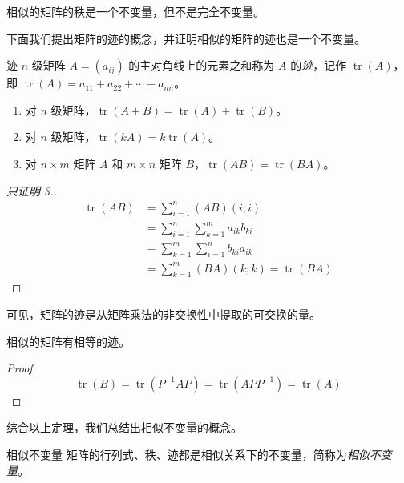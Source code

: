 \begin{theorem}
	相似的矩阵的秩是一个不变量，但不是完全不变量。
\end{theorem}

下面我们提出矩阵的迹的概念，并证明相似的矩阵的迹也是一个不变量。

\begin{definition}{迹}
	$n$ 级矩阵 $A = (a_{ij})$ 的主对角线上的元素之和称为 $A$ 的\emph{迹}，记作 $\operatorname{tr}(A)$， 即 $\operatorname{tr}(A) = a_{11} + a_{22} + \cdots + a_{nn}$。
\end{definition}

\begin{theorem}[矩阵的迹的运算性质]
	\begin{enumerate}
		\item 对 $n$ 级矩阵，$\operatorname{tr}(A + B) = \operatorname{tr}(A) + \operatorname{tr}(B)$。
		\item 对 $n$ 级矩阵，$\operatorname{tr}(kA) = k \operatorname{tr}(A)$。
		\item 对 $n \times m$ 矩阵 $A$ 和 $m \times n$ 矩阵 $B$，$\operatorname{tr}(AB) = \operatorname{tr}(BA)$。
	\end{enumerate}
\end{theorem}

\begin{proof}[只证明 3.]
	$$
	\begin{aligned}
		\operatorname{tr}(AB) &= \sum\limits_{i = 1}^n (AB)(i; i)
		\\&=
		\sum\limits_{i = 1}^n \sum\limits_{k = 1}^m a_{ik} b_{ki}
		\\&=
		\sum\limits_{k = 1}^m \sum\limits_{i = 1}^n b_{ki} a_{ik}
		\\&=
		\sum\limits_{k = 1}^m (BA)(k;k) = \operatorname{tr}(BA)
	\end{aligned}
	$$
\end{proof}

可见，矩阵的迹是从矩阵乘法的非交换性中提取的可交换的量。

\begin{theorem}
	相似的矩阵有相等的迹。
\end{theorem}

\begin{proof}
	$$
	\operatorname{tr}(B) = \operatorname{tr}(P^{-1} A P) = \operatorname{tr}(APP^{-1}) = \operatorname{tr}(A)
	$$
\end{proof}

综合以上定理，我们总结出相似不变量的概念。

\begin{definition}{相似不变量}
	矩阵的行列式、秩、迹都是相似关系下的不变量，简称为\emph{相似不变量}。
\end{definition}

